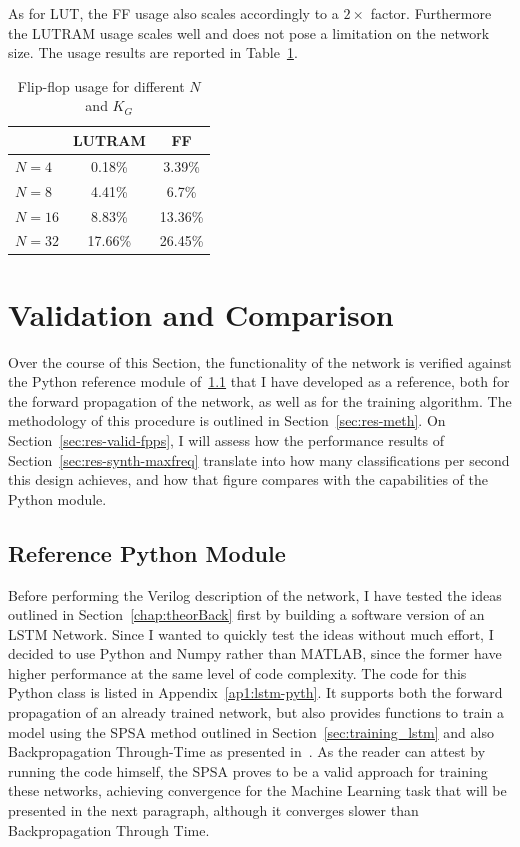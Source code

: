 As for LUT, the FF usage also scales accordingly to a $2\times$ factor. Furthermore the LUTRAM usage scales well and does not pose a limitation on the network size. The usage results are reported in Table~\ref{tab:ff}.

\begin{table}
    \centering
  \begin{tabular}{ | l | c | c |}
    \hline
         & LUTRAM  & FF  \\ 
    \hline
    $N=4$ & 0.18\%  & 3.39\% \\    
    \hline
    $N=8$ & 4.41\%  & 6.7\% \\    
    \hline
    $N=16$ & 8.83\%  & 13.36\% \\    
    \hline
    $N=32$ & 17.66\% &  26.45\% \\    
\hline
  \end{tabular}
    \caption{Flip-flop usage for different $N$ and $K_G$}
    \label{tab:ff}
\end{table}

\section{Validation and Comparison}\label{sec:res-valid}
Over the course of this Section, the functionality of the network is verified against the Python reference module of~\ref{sec:res-pyth} that I have developed as a reference, both for the forward propagation of the network, as well as for the training algorithm. The methodology of this procedure is outlined in Section~\ref{sec:res-meth}. On Section~\ref{sec:res-valid-fpps}, I will assess how the performance results of Section~\ref{sec:res-synth-maxfreq} translate into how many classifications per second this design achieves, and how that figure compares with the capabilities of the Python module.

\subsection{Reference Python Module}\label{sec:res-pyth}
Before performing the Verilog description of the network, I have tested the ideas outlined in Section~\ref{chap:theorBack} first by building a software version of an LSTM Network. Since I wanted to quickly test the ideas without much effort, I decided to use Python and Numpy rather than MATLAB, since the former have higher performance at the same level of code complexity. The code for this Python class is listed in Appendix~\ref{ap1:lstm-pyth}. It supports both the forward propagation of an already trained network, but also provides functions to train a model using the SPSA method outlined in Section~\ref{sec:training_lstm} and also Backpropagation Through-Time as presented in~\cite{Greff15}. As the reader can attest by running the code himself, the SPSA proves to be a valid approach for training these networks, achieving convergence for the Machine Learning task that will be presented in the next paragraph, although it converges slower than Backpropagation Through Time.  

